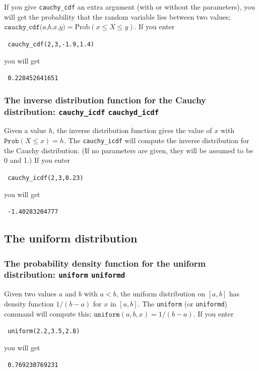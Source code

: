 \documentclass[a4paper,11pt]{book}
\begin{document}
If you give \texttt{cauchy\_cdf} an extra argument (with or without
the parameters), you will get the probability that
the random variable lies between two values;
$\texttt{cauchy\_cdf($a$,$b$,$x$,$y$)} = \text{Prob}(x \le X \le y)$.  If you
enter
\begin{center}
  \tt
  cauchy\_cdf(2,3,-1.9,1.4)
\end{center}
you will get
\begin{center}
  \tt
  0.228452641651
\end{center}

\subsubsection{The inverse distribution function for the
Cauchy distribution: \texttt{cauchy\_icdf} \texttt{cauchyd\_icdf}}

Given a value $h$, the inverse distribution function gives
the value of $x$ with $\texttt{Prob}(X \le x) = h$.
The \texttt{cauchy\_icdf} will compute the
inverse distribution for the Cauchy distribution.  (If no
parameters are given, they will be assumed to be 0 and 1.)
If you enter
\begin{center}
  \tt
  cauchy\_icdf(2,3,0.23)
\end{center}
you will get
\begin{center}
  \tt
  -1.40283204777
\end{center}

\subsection{The uniform distribution}
\subsubsection{The probability density function for the uniform
distribution: \texttt{uniform} \texttt{uniformd}}

Given two values $a$ and $b$ with $a < b$, the uniform distribution on
$[a,b]$ has density function $1/(b-a)$ for $x$ in $[a,b]$.  The 
\texttt{uniform} (or \texttt{uniformd}) command will compute this;
$\texttt{uniform}(a,b,x) = 1/(b-a)$.  If you enter
\begin{center}
  \tt
  uniform(2.2,3.5,2.8)
\end{center}
you will get
\begin{center}
  \tt
  0.769230769231
\end{center}
\end{document}
